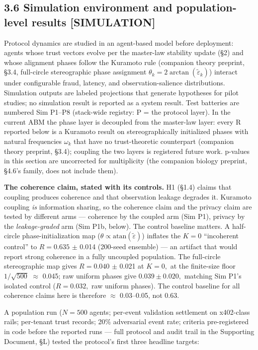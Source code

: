 \documentclass[11pt,twocolumn]{article}
\begin{document}
\subsection*{3.6 Simulation environment and population-level results
{[}SIMULATION{]}}

Protocol dynamics are studied in an agent-based model before deployment:
agents whose trust vectors evolve per the master-law stability update
(§2) and whose alignment phases follow the Kuramoto rule (companion theory preprint, §3.4, full-circle stereographic phase assignment
\(\theta_k = 2\arctan(\tilde{\varepsilon}_k)\)) interact under
configurable fraud, latency, and observation-salience distributions.
Simulation outputs are labeled projections that generate hypotheses for
pilot studies; no simulation result is reported as a system result. Test
batteries are numbered Sim P1--P8 (stack-wide registry: P = the protocol
layer). In the current ABM the phase layer is decoupled from the
master-law layer: every R reported below is a Kuramoto result on
stereographically initialized phases with natural frequencies
\(\omega_k\) that have no trust-theoretic counterpart (companion theory preprint, §3.4);
coupling the two layers is registered future work. p-values in this
section are uncorrected for multiplicity (the companion biology preprint, §4.6's family, does not
include them).

\textbf{The coherence claim, stated with its controls.} H1 (§1.4)
claims that coupling produces coherence and that observation leakage degrades
it. Kuramoto coupling \emph{is} information sharing, so the coherence claim
and the privacy claim are tested by different arms --- coherence by the coupled
arm (Sim P1), privacy by the \emph{leakage-graded} arm (Sim P1b, below). The
control baseline matters. A half-circle phase-initialization map
(\(\theta \propto \mathrm{atan}(\tilde{\varepsilon})\)) inflates the
\(K = 0\) ``incoherent control'' to \(R = 0.635\) \(\pm\) 0.014
(200-seed ensemble) --- an artifact that would report strong coherence in a
fully uncoupled population. The full-circle stereographic map gives \(R =
0.040\) \(\pm\) 0.021 at \(K = 0,\) at the finite-size floor
\(1/\sqrt{500}\) \(\approx\) 0.045; raw uniform phases give \(0.039
\pm 0.020,\) matching Sim P1's isolated control (\(R = 0.032,\) raw
uniform phases). The control baseline for all coherence claims here is
therefore \(\approx\) 0.03--0.05, not 0.63.

A population run (\(N = 500\) agents; per-event validation settlement on
x402-class rails; per-tenant trust records; 20\% adversarial event rate;
criteria pre-registered in code before the reported runs --- full
protocol and audit trail in the Supporting Document, §L) tested the
protocol's first three headline targets:
\end{document}
